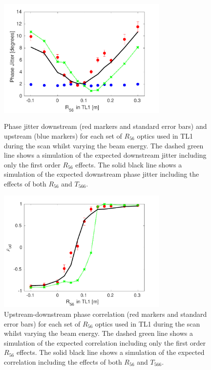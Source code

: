 \begin{figure}
  \centering
  \includegraphics[width=0.75\textwidth]{Figures/propagation/R56ScanGunWiggle_PhaseJitter}
  \caption{Phase jitter downstream (red markers and standard error bars) and upstream (blue markers) for each set of \(R_{56}\) optics used in TL1 during the scan whilst varying the beam energy. The dashed green line shows a simulation of the expected downstream jitter including only the first order \(R_{56}\) effects. The solid black line shows a simulation of the expected downstream phase jitter including the effects of both \(R_{56}\) and \(T_{566}\).}
  \label{f:R56ScanGunWiggle_PhaseJitter}
  \includegraphics[width=0.75\textwidth]{Figures/propagation/R56ScanGunWiggle_Correl}
  \caption{Upstream-downstream phase correlation (red markers and standard error bars) for each set of \(R_{56}\) optics used in TL1 during the scan whilst varying the beam energy. The dashed green line shows a simulation of the expected correlation including only the first order \(R_{56}\) effects. The solid black line shows a simulation of the expected correlation including the effects of both \(R_{56}\) and \(T_{566}\).}
  \label{f:R56ScanGunWiggle_Correl}
\end{figure}

